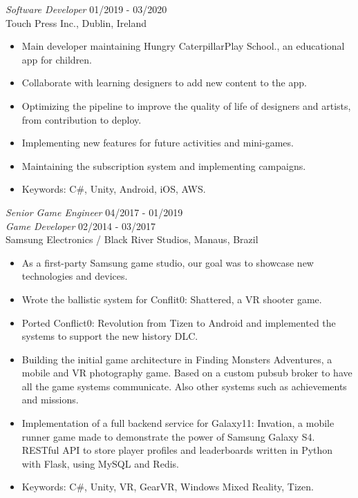 \documentclass[line,margin]{res}
\begin{document}
\begin{resume}
        {\sl Software Developer} \hfill 01/2019 - 03/2020 \\
		Touch Press Inc., Dublin, Ireland
        \begin{itemize}  \itemsep 1.25pt
            \item Main developer maintaining Hungry Caterpillar\texttrademark  Play School., an educational app for children.
            \item Collaborate with learning designers to add new content to the app.
            \item Optimizing the pipeline to improve the quality of life of designers and artists, from contribution to deploy.
            \item Implementing new features for future activities and mini-games.
            \item Maintaining the subscription system and implementing campaigns.
            \item Keywords: C\#, Unity, Android, iOS, AWS.
        \end{itemize}

        {\sl Senior Game Engineer} \hfill 04/2017 - 01/2019 \\
        {\sl Game Developer} \hfill 02/2014 - 03/2017 \\
                Samsung Electronics / Black River Studios, Manaus, Brazil
        \begin{itemize}  \itemsep 1.25pt
            \item As a first-party Samsung game studio, our goal was to showcase new technologies and devices.
            \item Wrote the ballistic system for Conflit0: Shattered, a VR shooter game.
            \item Ported Conflict0: Revolution from Tizen to Android and implemented the systems to support the new history DLC.
            \item Building the initial game architecture in Finding Monsters Adventures, a mobile and VR photography game. Based on a custom pubsub broker to have all the game systems communicate. Also other systems such as achievements and missions.
            \item Implementation of a full backend service for Galaxy11: Invation, a mobile runner game made to demonstrate the power of Samsung Galaxy S4. RESTful API to store player profiles and leaderboards written in Python with Flask, using MySQL and Redis.
            \item Keywords: C\#, Unity, VR, GearVR, Windows Mixed Reality, Tizen.
        \end{itemize}
                 

\end{resume}
\end{document}
